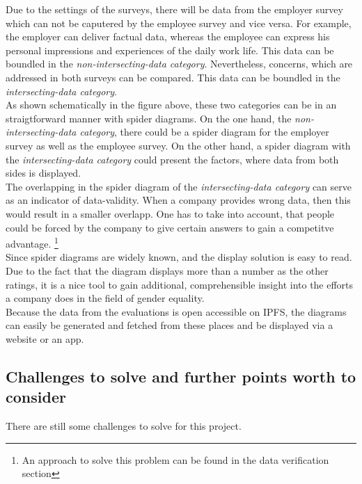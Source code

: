 \documentclass[portrait,a4paper]{article}
\begin{document}
		Due to the settings of the surveys, there will be data from the employer survey which can not be caputered 
		by the employee survey and vice versa. For example, the employer can deliver factual data, whereas the 
		employee can express his personal impressions and experiences of the daily work life. 
		This data can be boundled in the \textit{non-intersecting-data category}. Nevertheless, concerns, 
		which are addressed in both surveys can be compared. This data can be boundled in the \textit{intersecting-data category}.\\
		As shown schematically in the figure above, these two categories can be in an straigtforward 
		manner with spider diagrams. On the one hand, the \textit{non-intersecting-data category}, there could 
		be a spider diagram for the employer survey as well as the employee survey. 
		On the other hand, a spider diagram with the \textit{intersecting-data category} 
		could present the factors, where data from both sides is displayed.\\

		The overlapping in the spider diagram of the \textit{intersecting-data category} can serve as an 
		indicator of data-validity. When a company provides wrong data, then this would result in a smaller overlapp. 
		One has to take into account, that people could be forced by the company to give certain answers 
		to gain a competitve advantage. \footnote{An approach to solve this problem can be found in the data verification section}\\

		Since spider diagrams are widely known, and the display solution is easy to read. 
		Due to the fact that the diagram displays more than a number as the other ratings, 
		it is a nice tool to gain additional, comprehensible insight into the efforts a company does 
		in the field of gender equality.\\

		Because the data from the evaluations is open accessible on IPFS, the diagrams can easily be generated and 
		fetched from these places and be displayed via a website or an app.

	\subsection{Challenges to solve and further points worth to consider}
		There are still some challenges to solve for this project.\\
		
\end{document}
